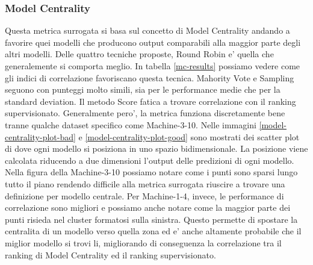 \subsubsection{Model Centrality}
Questa metrica surrogata si basa sul concetto di Model Centrality andando a favorire quei modelli che producono output comparabili alla maggior parte degli altri modelli. Delle quattro tecniche proposte, Round Robin e' quella che generalemente si comporta meglio. In tabella \ref{mc-results} possiamo vedere come gli indici di correlazione favoriscano questa tecnica.
Mahority Vote e Sampling seguono con punteggi molto simili, sia per le performance medie che per la standard deviation. Il metodo Score fatica a trovare correlazione con il ranking supervisionato. 
Generalmente pero', la metrica funziona discretamente bene tranne qualche dataset specifico come Machine-3-10.  Nelle immagini \ref{model-centrality-plot-bad} e \ref{model-centrality-plot-good} sono mostrati dei scatter plot di dove ogni modello si posiziona in uno spazio bidimensionale. La posizione viene calcolata riducendo a due dimensioni l'output delle predizioni di ogni modello.  Nella figura della Machine-3-10 possiamo notare come i punti sono sparsi lungo tutto il piano rendendo difficile alla metrica surrogata riuscire a trovare una definizione per modello centrale.
Per Machine-1-4, invece, le performance di correlazione sono migliori e possiamo anche notare come la maggior parte dei punti risieda nel cluster formatosi sulla sinistra. Questo permette di spostare la centralita di un modello verso quella zona ed e' anche altamente probabile che il miglior modello si trovi li, migliorando di conseguenza la correlazione tra il ranking di Model Centrality ed il ranking supervisionato.


